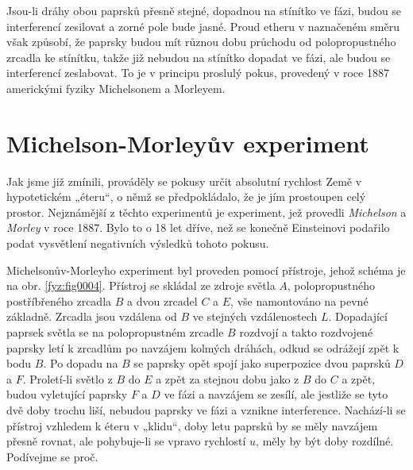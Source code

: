 
    Jsou-li dráhy obou paprsků přesně stejné, dopadnou na stínítko ve fázi, budou se interferencí
    zesilovat a zorné pole bude jasné. Proud etheru v naznačeném směru však způsobí, že paprsky
    budou mít různou dobu průchodu od polopropustného zrcadla ke stínítku, takže již nebudou na
    stínítko dopadat ve fázi, ale budou se interferencí zeslabovat. To je v principu proslulý pokus,
    provedený v roce 1887 americkými fyziky Michelsonem a Morleyem.

  
  \section{Michelson-Morleyův experiment}\label{fyz:IchapXVsecV}
    Jak jsme již zmínili, prováděly se pokusy určit absolutní rychlost Země v hypotetickém „éteru“, 
    o němž se předpokládalo, že je jím prostoupen celý prostor. Nejznámější z těchto experimentů je 
    experiment, jež provedli \emph{Michelson} a \emph{Morley} v roce \num{1887}. Bylo to o \num{18} 
    let dříve, než se konečně Einsteinovi podařilo podat vysvětlení negativních výsledků tohoto 
    pokusu.

    Michelsonův-Morleyho experiment byl proveden pomocí přístroje, jehož schéma je na obr. 
    \ref{fyz:fig0004}. Přístroj se skládal ze zdroje světla \(A\), polopropustného postříbřeného 
    zrcadla \(B\) a dvou zrcadel \(C\) a \(E\), vše namontováno na pevné základně. Zrcadla jsou 
    vzdálena od \(B\) ve stejných vzdálenostech \(L\). Dopadající paprsek světla se na 
    polopropustném zrcadle \(B\) rozdvojí a takto rozdvojené paprsky letí k zrcadlům po navzájem 
    kolmých dráhách, odkud se odrážejí zpět k bodu \(B\). Po dopadu na \(B\) se paprsky opět spojí 
    jako superpozice dvou paprsků \(D\) a \(F\). Proletí-li světlo z \(B\) do \(E\) a zpět za 
    stejnou dobu jako z \(B\) do \(C\) a zpět, budou vyletující paprsky \(F\) a \(D\) ve fázi a 
    navzájem se zesílí, ale jestliže se tyto dvě doby trochu liší, nebudou paprsky ve fázi a 
    vznikne interference. Nachází-li se přístroj vzhledem k éteru v „klidu“, doby letu paprsků by 
    se měly navzájem přesně rovnat, ale pohybuje-li se vpravo rychlostí \(u\), měly by být doby 
    rozdílné. Podívejme se proč.
    
